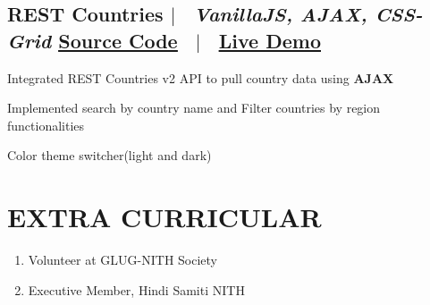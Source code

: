 \documentclass[12pt]{article}
\begin{document}
\subsection*{
  REST Countries 
  $|$ 
  \normalsize \normalfont \ \textit{VanillaJS, AJAX, CSS-Grid }
  \hfill 
  \normalsize \underline{\href{https://github.com/HARSH-SHETH/REST_Countries_API}{Source Code}}
  \ $|$ \ 
  \normalsize \underline{\href{https://rest-countries-api-pn9ccplnz-harsh-sheth.vercel.app}{Live Demo}}
}
  \begin{description}
    \setlength{\itemsep}{0em}
    \setlength{\itemindent}{2\parindent}
    \item[$\bullet$]{Integrated REST Countries v2 API to pull country data using \textbf{AJAX}}
    \item[$\bullet$]{Implemented search by country name and Filter countries by region functionalities} 
    \item[$\bullet$]{Color theme switcher(light and dark)}
  \end{description}



\section{EXTRA CURRICULAR}
\begin{enumerate}
  \setlength{\itemsep}{0em}
  \item Volunteer at GLUG-NITH Society
  \item Executive Member, Hindi Samiti NITH
\end{enumerate}
\end{document}

